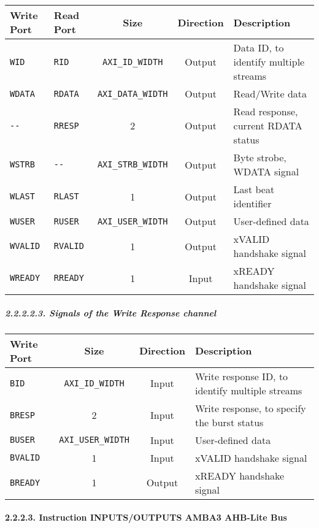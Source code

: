 \documentclass[]{article}
\let\oldparagraph\paragraph
\renewcommand{\paragraph}[1]{\oldparagraph{#1}\mbox{}}
\let\oldsubparagraph\subparagraph
\renewcommand{\subparagraph}[1]{\oldsubparagraph{#1}\mbox{}}
\begin{document}
\begin{longtable}[]{@{}llccl@{}}
\toprule
Write Port & Read Port & Size & Direction & Description\tabularnewline
\midrule
\endhead
\texttt{WID} & \texttt{RID} & \texttt{AXI\_ID\_WIDTH} & Output & Data
ID, to identify multiple streams\tabularnewline
\texttt{WDATA} & \texttt{RDATA} & \texttt{AXI\_DATA\_WIDTH} & Output &
Read/Write data\tabularnewline
\texttt{-\/-} & \texttt{RRESP} & 2 & Output & Read response, current
RDATA status\tabularnewline
\texttt{WSTRB} & \texttt{-\/-} & \texttt{AXI\_STRB\_WIDTH} & Output &
Byte strobe, WDATA signal\tabularnewline
\texttt{WLAST} & \texttt{RLAST} & 1 & Output & Last beat
identifier\tabularnewline
\texttt{WUSER} & \texttt{RUSER} & \texttt{AXI\_USER\_WIDTH} & Output &
User-defined data\tabularnewline
\texttt{WVALID} & \texttt{RVALID} & 1 & Output & xVALID handshake
signal\tabularnewline
\texttt{WREADY} & \texttt{RREADY} & 1 & Input & xREADY handshake
signal\tabularnewline
\bottomrule
\end{longtable}

\hypertarget{signals-of-the-write-response-channel}{%
\subparagraph{2.2.2.2.3. Signals of the Write Response
channel}\label{signals-of-the-write-response-channel}}

\begin{longtable}[]{@{}lccl@{}}
\toprule
Write Port & Size & Direction & Description\tabularnewline
\midrule
\endhead
\texttt{BID} & \texttt{AXI\_ID\_WIDTH} & Input & Write response ID, to
identify multiple streams\tabularnewline
\texttt{BRESP} & 2 & Input & Write response, to specify the burst
status\tabularnewline
\texttt{BUSER} & \texttt{AXI\_USER\_WIDTH} & Input & User-defined
data\tabularnewline
\texttt{BVALID} & 1 & Input & xVALID handshake signal\tabularnewline
\texttt{BREADY} & 1 & Output & xREADY handshake signal\tabularnewline
\bottomrule
\end{longtable}

\hypertarget{instruction-inputsoutputs-amba3-ahb-lite-bus}{%
\paragraph{2.2.2.3. Instruction INPUTS/OUTPUTS AMBA3 AHB-Lite
Bus}\label{instruction-inputsoutputs-amba3-ahb-lite-bus}}
\end{document}
